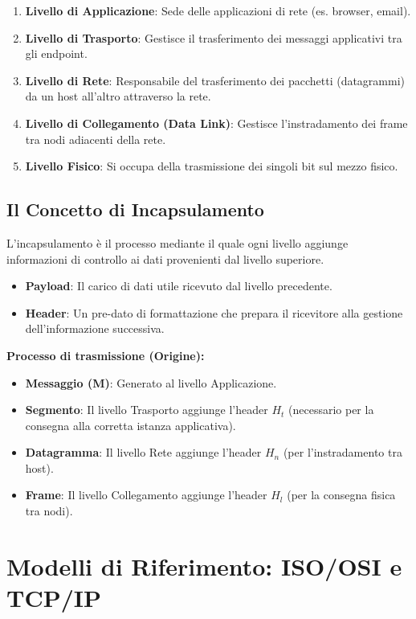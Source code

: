 \documentclass[12pt,a4paper,oneside]{book}
\begin{document}
\begin{enumerate}
    \item \textbf{Livello di Applicazione}: Sede delle applicazioni di rete (es. browser, email).
    \item \textbf{Livello di Trasporto}: Gestisce il trasferimento dei messaggi applicativi tra gli endpoint.
    \item \textbf{Livello di Rete}: Responsabile del trasferimento dei pacchetti (datagrammi) da un host all'altro attraverso la rete.
    \item \textbf{Livello di Collegamento (Data Link)}: Gestisce l'instradamento dei frame tra nodi adiacenti della rete.
    \item \textbf{Livello Fisico}: Si occupa della trasmissione dei singoli bit sul mezzo fisico.
\end{enumerate}

\subsection{Il Concetto di Incapsulamento}
L'incapsulamento è il processo mediante il quale ogni livello aggiunge informazioni di controllo ai dati provenienti dal livello superiore.

\begin{itemize}
    \item \textbf{Payload}: Il carico di dati utile ricevuto dal livello precedente.
    \item \textbf{Header}: Un pre-dato di formattazione che prepara il ricevitore alla gestione dell'informazione successiva.
\end{itemize}

\textbf{Processo di trasmissione (Origine):}
\begin{itemize}
    \item \textbf{Messaggio (M)}: Generato al livello Applicazione.
    \item \textbf{Segmento}: Il livello Trasporto aggiunge l'header $H_t$ (necessario per la consegna alla corretta istanza applicativa).
    \item \textbf{Datagramma}: Il livello Rete aggiunge l'header $H_n$ (per l'instradamento tra host).
    \item \textbf{Frame}: Il livello Collegamento aggiunge l'header $H_l$ (per la consegna fisica tra nodi).
\end{itemize}


\section{Modelli di Riferimento: ISO/OSI e TCP/IP}
\end{document}
